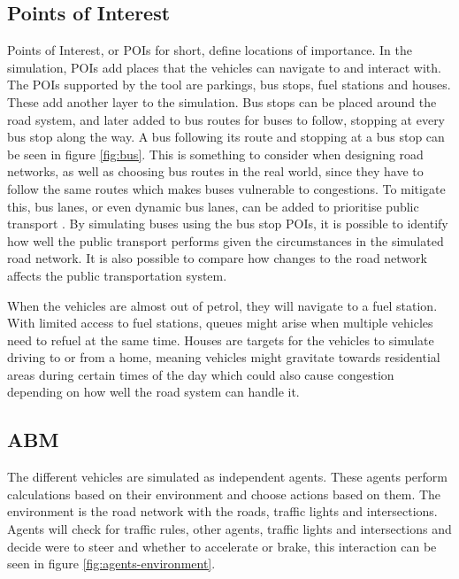     \subsection{Points of Interest} \label{poi}
        Points of Interest, or POIs for short, define locations of importance. In the simulation, POIs add places that the vehicles can navigate to and interact with. The POIs supported by the tool are parkings, bus stops, fuel stations and houses. These add another layer to the simulation. Bus stops can be placed around the road system, and later added to bus routes for buses to follow, stopping at every bus stop along the way. A bus following its route and stopping at a bus stop can be seen in figure \ref{fig:bus}. This is something to consider when designing road networks, as well as choosing bus routes in the real world, since they have to follow the same routes which makes buses vulnerable to congestions. To mitigate this, bus lanes, or even dynamic bus lanes, can be added to prioritise public transport \cite{bus-lanes}. By simulating buses using the bus stop POIs, it is possible to identify how well the public transport performs given the circumstances in the simulated road network. It is also possible to compare how changes to the road network affects the public transportation system.
        

        When the vehicles are almost out of petrol, they will navigate to a fuel station. With limited access to fuel stations, queues might arise when multiple vehicles need to refuel at the same time. Houses are targets for the vehicles to simulate driving to or from a home, meaning vehicles might gravitate towards residential areas during certain times of the day which could also cause congestion depending on how well the road system can handle it.

    \subsection{ABM}
        The different vehicles are simulated as independent agents. These agents perform calculations based on their environment and choose actions based on them. The environment is the road network with the roads, traffic lights and intersections. Agents will check for traffic rules, other agents, traffic lights and intersections and decide were to steer and whether to accelerate or brake, this interaction can be seen in figure \ref{fig:agents-environment}. 
    

